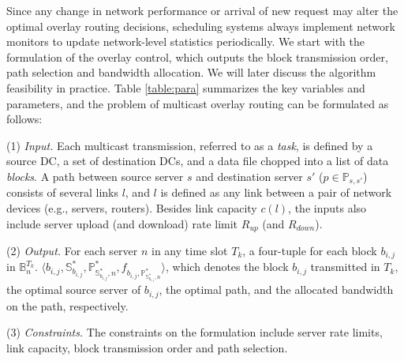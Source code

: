 Since any change in network performance or arrival of
new request may alter the optimal overlay
routing decisions, scheduling systems always implement network monitors to update network-level statistics periodically. We start with the formulation of the overlay control, which outputs the block transmission order, path selection and bandwidth allocation. We will later discuss the algorithm feasibility in practice.
Table \ref{table:para} summarizes the key variables and parameters, and the problem of multicast overlay routing can be formulated as follows:


\noindent(1) {\em Input.} %
Each multicast transmission, referred to as a {\em task}, is defined
by a source DC, a set of destination DCs, and a data file chopped into
a list of data {\em blocks}.
A path between source server $s$ and destination server $s'$ ($p\in \mathbb{P}_{s,s'}$) consists of several links $l$, and $l$ is defined as any link between a pair of network devices (e.g., servers, routers).
Besides link capacity $c(l)$, the inputs also include 
server upload (and download) rate limit $R_{up}$ (and $R_{down}$).

\noindent(2) {\em Output.} For each server $n$ in any time slot $T_k$, a four-tuple for each block $b_{i,j}$ in $\mathbb{B}_n^{T_k}$. $\langle b_{i,j}, \mathbb{S}^*_{b_{i,j}}, \mathbb{P}^*_{\mathbb{S}^*_{b_{i,j}},n}, f_{b_{i,j},\mathbb{P}^*_{\mathbb{S}^*_{b_{i,j}},n}} \rangle$, which denotes the block $b_{i,j}$ transmitted in $T_k$, the optimal source server of $b_{i,j}$, the optimal path, and the allocated bandwidth on the path, respectively.

\noindent(3) {\em Constraints.}
The constraints on the formulation include server rate limits, link capacity, block transmission order and path selection.

